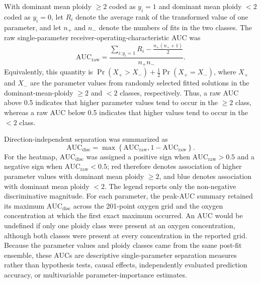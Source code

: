 \documentclass[11pt]{article}
\begin{document}
With dominant mean ploidy $\geq2$ coded as $y_i=1$ and dominant mean ploidy $<2$ coded as $y_i=0$, let $R_i$ denote the average rank of the transformed value of one parameter, and let $n_+$ and $n_-$ denote the numbers of fits in the two classes. The raw single-parameter receiver-operating-characteristic AUC was
\begin{equation}
\mathrm{AUC}_{\mathrm{raw}}
=
\frac{
\sum_{i:y_i=1}R_i-\frac{n_+(n_++1)}{2}
}{
n_+n_-
}.
\label{eq:appendix_single_parameter_auc}
\end{equation}
Equivalently, this quantity is
\(
\Pr(X_+>X_-)+\tfrac{1}{2}\Pr(X_+=X_-)
\),
where $X_+$ and $X_-$ are the parameter values from randomly selected fitted solutions in the dominant-mean-ploidy $\geq2$ and $<2$ classes, respectively. Thus, a raw AUC above 0.5 indicates that higher parameter values tend to occur in the $\geq2$ class, whereas a raw AUC below 0.5 indicates that higher values tend to occur in the $<2$ class.

Direction-independent separation was summarized as
\begin{equation}
\mathrm{AUC}_{\mathrm{disc}}
=
\max\left\{
\mathrm{AUC}_{\mathrm{raw}},
1-\mathrm{AUC}_{\mathrm{raw}}
\right\}.
\label{eq:appendix_discriminative_auc}
\end{equation}
For the heatmap, $\mathrm{AUC}_{\mathrm{disc}}$ was assigned a positive sign when $\mathrm{AUC}_{\mathrm{raw}}>0.5$ and a negative sign when $\mathrm{AUC}_{\mathrm{raw}}<0.5$; red therefore denotes association of higher parameter values with dominant mean ploidy $\geq2$, and blue denotes association with dominant mean ploidy $<2$. The legend reports only the non-negative discriminative magnitude. For each parameter, the peak-AUC summary retained its maximum $\mathrm{AUC}_{\mathrm{disc}}$ across the 201-point oxygen grid and the oxygen concentration at which the first exact maximum occurred. An AUC would be undefined if only one ploidy class were present at an oxygen concentration, although both classes were present at every concentration in the reported grid. Because the parameter values and ploidy classes came from the same post-fit ensemble, these AUCs are descriptive single-parameter separation measures rather than hypothesis tests, causal effects, independently evaluated prediction accuracy, or multivariable parameter-importance estimates.
\end{document}
